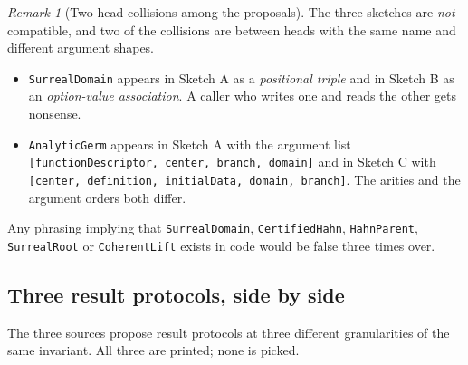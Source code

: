 \documentclass[11pt,letterpaper]{article}
\numberwithin{equation}{section}
\theoremstyle{definition}
\theoremstyle{remark}
\newtheorem{remark}[theorem]{Remark}
\begin{document}
\begin{remark}[Two head collisions among the proposals]\label{cas:rem-headcollisions}
The three sketches are \emph{not} compatible, and two of the collisions are
between heads with the same name and different argument shapes.
\begin{itemize}
\item \texttt{SurrealDomain} appears in Sketch A as a \emph{positional triple}
and in Sketch B as an \emph{option-value association}. A caller who writes one
and reads the other gets nonsense.
\item \texttt{AnalyticGerm} appears in Sketch A with the argument list
\texttt{[functionDescriptor, center, branch, domain]} and in Sketch C with
\texttt{[center, definition, initialData, domain, branch]}. The arities and the
argument orders both differ.
\end{itemize}
Any phrasing implying that \texttt{SurrealDomain}, \texttt{CertifiedHahn},
\texttt{HahnParent}, \texttt{SurrealRoot} or \texttt{CoherentLift} exists in
code would be false three times over.
\end{remark}

\subsection{Three result protocols, side by side}
\label{cas:sub-protocols}
The three sources propose result protocols at three different granularities of
the same invariant. All three are printed; none is picked.
\end{document}
